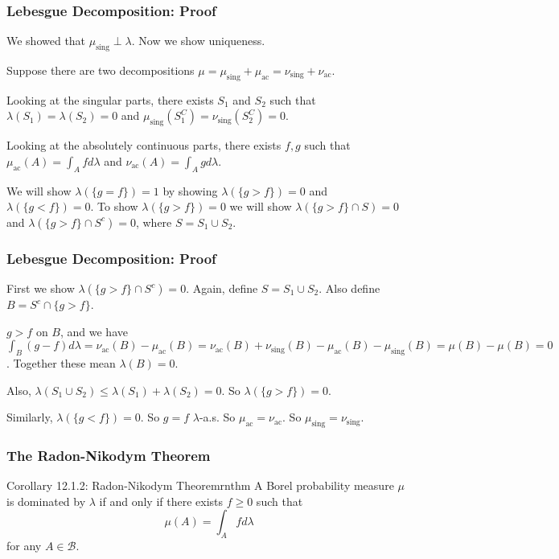 \documentclass[handout]{beamer}
\begin{document}
\frame
{
\frametitle{Lebesgue Decomposition: Proof} 

We showed that $\mu_{\text{sing}} \perp \lambda$. Now we show uniqueness.
\newline

Suppose there are two decompositions $\mu = \mu_{\text{sing}} + \mu_{\text{ac}} = \nu_{\text{sing}} + \nu_{\text{ac}}$. 
\newline

Looking at the singular parts, there exists $S_1$ and $S_2$ such that $\lambda(S_1) = \lambda(S_2) = 0$ and $\mu_{\text{sing}}(S_1^C) = \nu_{\text{sing}}(S_2^C) = 0$. 
\newline

Looking at the absolutely continuous parts, there exists $f,g$ such that $\mu_{\text{ac}}(A) = \int_A f d\lambda$ and $\nu_{\text{ac}}(A)= \int_A g d\lambda$.
\newline

We will show $\lambda(\{g = f\}) = 1$ by showing $\lambda(\{g > f\}) = 0$ and $\lambda(\{g < f\}) = 0$. To show $\lambda(\{g > f\}) = 0$ we will show $\lambda(\{g > f\} \cap S) = 0$ and $\lambda(\{g > f\} \cap S^c ) = 0$, where $S = S_1 \cup S_2$.
}


\frame
{
\frametitle{Lebesgue Decomposition: Proof} 

First we show $\lambda(\{g > f\} \cap S^c ) = 0$. Again, define $S = S_1 \cup S_2$. Also define $B = S^c \cap \{g > f\}$.
\newline

$g > f$ on $B$, and we have $\int_B (g-f)d\lambda = \nu_{\text{ac}}(B) - \mu_{\text{ac}}(B) = \nu_{\text{ac}}(B) + \nu_{\text{sing}}(B) - \mu_{\text{ac}}(B) - \mu_{\text{sing}}(B)  = \mu(B) - \mu(B) =0$. Together these mean $\lambda(B) = 0$.
\newline

Also, $\lambda(S_1 \cup S_2) \le \lambda(S_1) + \lambda(S_2) = 0$. So $\lambda(\{g > f\}) = 0$.
\newline

Similarly, $\lambda(\{g < f\}) = 0$. So $g = f$ $\lambda$-a.s. So $\mu_{\text{ac}} = \nu_{\text{ac}}$. So $\mu_{\text{sing}} = \nu_{\text{sing}}$.
}


\frame
{
\frametitle{The Radon-Nikodym Theorem} 

\begin{mytheo}{Corollary 12.1.2: Radon-Nikodym Theorem}{rnthm}
A Borel probability measure $\mu$ is dominated by $\lambda$ if and only if there exists $f \ge 0$ such that
$$
\mu(A) = \int_A f d\lambda
$$
for any $A \in \mathcal{B}$.
\end{mytheo}

}
\end{document}
